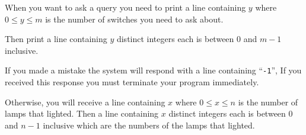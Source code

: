 When you want to ask a query you need to print a line containing $y$ where $0 \le y \le m$ is the number of switches you need to ask about.

Then print a line containing $y$ distinct integers each is between $0$ and $m-1$ inclusive.

If you made a mistake the system will respond with a line containing ``\texttt{-1}'', If you received this response you must terminate your program immediately.

Otherwise, you will receive a line containing $x$ where  $0 \le x \le n$ is the number of lamps that lighted. Then a line containing $x$ distinct integers each is between $0$ and $n-1$ inclusive which are the numbers of the lamps that lighted.